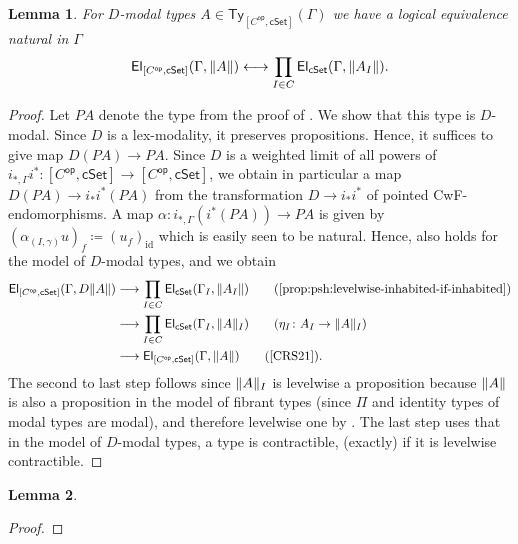\documentclass[10pt,a4paper]{article}
\newtheorem{lemma}{Lemma}[section]
\newcommand{\cSet}{\mathsf{cSet}}
\DeclareMathOperator\op{\mathsf{op}}
\newcommand\Ty{\mathsf{Ty}}
\newcommand\El{\mathsf{El}}
\DeclareMathOperator\id{id}
\begin{document}
\begin{lemma}\label{prop:psh:modal:levelwise-inhabited-iff-inhabited}
  For \(D\)-modal types \(A \in \Ty_{[C^{\op}, \cSet]}(\Gamma)\) we have a logical equivalence natural in \(\Gamma\)
  \[
    \El_{[C^{\op}, \cSet]}(\Gamma, \trunc{ A }) \longleftrightarrow \prod_{I \in C} \El_{\cSet}(\Gamma, \trunc{A_I}).
  \]
\end{lemma}
\begin{proof}
  Let \(PA\) denote the type from the proof of .
  We show that this type is \(D\)-modal.
  Since \(D\) is a lex-modality, it preserves propositions.
  Hence, it suffices to give map \(D(PA) \to PA\).
  Since \(D\) is a weighted limit of all powers of \(i_{*,\Gamma}i^* \colon [C^{\op}, \cSet] \to [C^{\op}, \cSet]\), we obtain in particular a map \(D(PA) \to i_*i^*(PA)\) from the transformation \(D \to i_*i^*\) of pointed CwF-endomorphisms. %
  A map \(\alpha \colon i_{*,\Gamma}(i^*(PA)) \to PA\) is given by \((\alpha_{(I, \gamma)}u)_f \coloneqq (u_{f})_{\id}\) which is easily seen to be natural.
  Hence,  also holds for the model of \(D\)-modal types, and we obtain
  \begin{align*}
    \El_{[C^{\op}, \cSet]}(\Gamma, D\trunc{A})
    &\longrightarrow \prod_{I \in C} \El_{\cSet}(\Gamma_I, \trunc{A_I}) \tag{\Cref{prop:psh:levelwise-inhabited-if-inhabited}} \\
    &\longrightarrow \prod_{I \in C} \El_{\cSet}(\Gamma_I, \trunc{A}_I) \tag{$\eta_I \colon A_I \to \trunc{A}_I$}  \\
    &\longrightarrow \El_{[C^{\op}, \cSet]}(\Gamma, \trunc{A}) \tag{\cite[Proposition~16]{CRS21}}.
  \end{align*}
  The second to last step follows since $\trunc{A}_I$ is levelwise a proposition because \(\trunc{A}\) is also a proposition in the model of fibrant types (since \(\Pi\) and identity types of modal types are modal), and therefore levelwise one by .
  The last step uses that in the model of $D$-modal types, a type is contractible, (exactly) if it is levelwise contractible.
\end{proof}

\begin{lemma}\label{prop:psh:modal:levelwise-quotient-iff-homotopy-quotient}
\end{lemma}
\begin{proof}
  
\end{proof}
\end{document}
